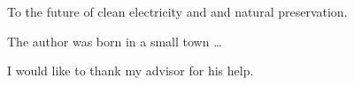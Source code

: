 \begin{abstract}
  \lipsum[1-3]
\end{abstract}

\makecopyrightpage

\maketitlepage

\begin{dedication}
  \centering To the future of clean electricity and and natural preservation.
\end{dedication}

\begin{biography}
  The author was born in a small town \ldots
\end{biography}

\begin{acknowledgements}
  I would like to thank my advisor for his help.
\end{acknowledgements}

\thesistableofcontents

\thesislistoftables

\thesislistoffigures
